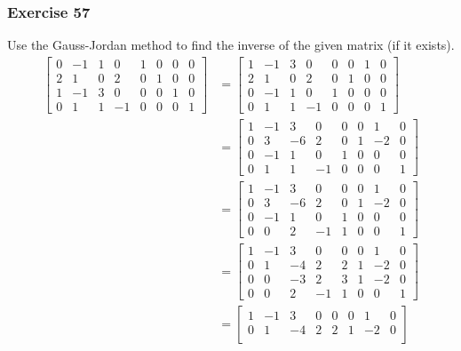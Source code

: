 \documentclass{math}
\begin{document}
\subsubsection*{Exercise 57}
Use the Gauss-Jordan method to find the inverse of the given matrix (if it
exists).
\begin{align*}
  \begin{bmatrix}
    0 & -1 & 1 & 0 & 1 & 0 & 0 & 0 \\
    2 & 1 & 0 & 2 & 0 & 1 & 0 & 0 \\
    1 & -1 & 3 & 0 & 0 & 0 & 1 & 0 \\
    0 & 1 & 1 & -1 & 0 & 0 & 0 & 1
  \end{bmatrix} &= \begin{bmatrix}
    1 & -1 & 3 &  0 & 0 & 0 & 1 & 0 \\
    2 &  1 & 0 &  2 & 0 & 1 & 0 & 0 \\
    0 & -1 & 1 &  0 & 1 & 0 & 0 & 0 \\
    0 &  1 & 1 & -1 & 0 & 0 & 0 & 1
  \end{bmatrix} \\
  &= \begin{bmatrix}
    1 & -1 & 3 & 0 & 0 & 0 & 1 & 0 \\
    0 & 3 & -6 & 2 & 0 & 1 & -2 & 0 \\
    0 & -1 & 1 & 0 & 1 & 0 & 0 & 0 \\
    0 & 1 & 1 & -1 & 0 & 0 & 0 & 1
  \end{bmatrix} \\
  &= \begin{bmatrix}
    1 & -1 & 3 & 0 & 0 & 0 & 1 & 0 \\
    0 & 3 & -6 & 2 & 0 & 1 & -2 & 0 \\
    0 & -1 & 1 & 0 & 1 & 0 & 0 & 0 \\
    0 & 0 & 2 & -1 & 1 & 0 & 0 & 1
  \end{bmatrix} \\
  &= \begin{bmatrix}
    1 & -1 & 3 & 0 & 0 & 0 & 1 & 0 \\
    0 & 1 & -4 & 2 & 2 & 1 & -2 & 0 \\
    0 & 0 & -3 & 2 & 3 & 1 & -2 & 0 \\
    0 & 0 & 2 & -1 & 1 & 0 & 0 & 1
  \end{bmatrix} \\
  &= \begin{bmatrix}
    1 & -1 & 3 & 0 & 0 & 0 & 1 & 0 \\
    0 & 1 & -4 & 2 & 2 & 1 & -2 & 0 \\

\end{bmatrix}
\end{align*}
\end{document}
